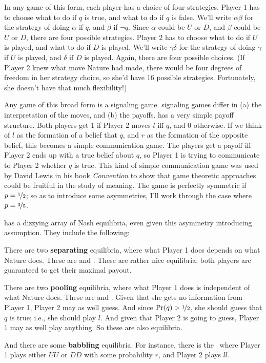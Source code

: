 In any game of this form, each player has a choice of four strategies. Player 1 has to choose what to do if $q$ is true, and what to do if $q$ is false. We'll write $\alpha \beta$ for the strategy of doing $\alpha$ if $q$, and $\beta$ if $\neg q$. Since $\alpha$ could be $U$ or $D$, and $\beta$ could be $U$ or $D$, there are four possible strategies. Player 2 has to choose what to do if $U$ is played, and what to do if $D$ is played. We'll write $\gamma \delta$ for the strategy of doing $\gamma$ if $U$ is played, and $\delta$ if $D$ is played. Again, there are four possible choices. (If Player 2 knew what move Nature had made, there would be four degrees of freedom in her strategy choice, so she'd have 16 possible strategies. Fortunately, she doesn't have that much flexibility!)

Any game of this broad form is a signaling game. signaling games differ in (a) the interpretation of the moves, and (b) the payoffs.  has a very simple payoff structure. Both players get 1 if Player 2 moves $l$ iff $q$, and 0 otherwise. If we think of $l$ as the formation of a belief that $q$, and $r$ as the formation of the opposite belief, this becomes a simple communication game. The players get a payoff iff Player 2 ends up with a true belief about $q$, so Player 1 is trying to communicate to Player 2 whether $q$ is true. This kind of simple communication game was used by David Lewis in his book \textit{Convention} to show that game theoretic approaches could be fruitful in the study of meaning. The game is perfectly symmetric if $p = \nicefrac{1}{2}$; so as to introduce some asymmetries, I'll work through the case where $p = \nicefrac{3}{5}$.

 has a dizzying array of Nash equilibria, even given this asymmetry introducing assumption. They include the following:

\begin{itemize*}
\item There are two \textbf{separating} equilibria, where what Player 1 does depends on what Nature does. These are  and . These are rather nice equilibria; both players are guaranteed to get their maximal payout.
\item There are two \textbf{pooling} equilibria, where what Player 1 does is independent of what Nature does. These are  and . Given that she gets no information from Player 1, Player 2 may as well guess. And since $\Pr(q) > \nicefrac{1}{2}$, she should guess that $q$ is true; i.e., she should play $l$. And given that Player 2 is going to guess, Player 1 may as well play anything. So these are also equilibria.
\item And there are some \textbf{babbling} equilibria. For instance, there is the \eqm\ where Player 1 plays either $UU$ or $DD$ with some probability $r$, and Player 2 plays $ll$.
\end{itemize*}

